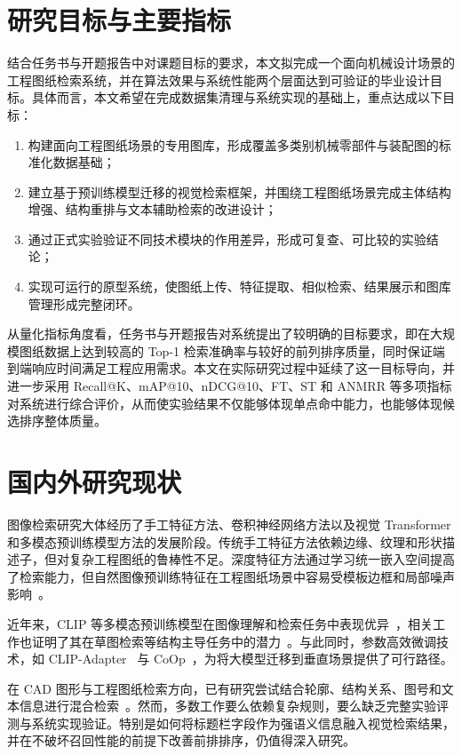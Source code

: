 \section{研究目标与主要指标}

结合任务书与开题报告中对课题目标的要求，本文拟完成一个面向机械设计场景的工程图纸检索系统，并在算法效果与系统性能两个层面达到可验证的毕业设计目标。具体而言，本文希望在完成数据集清理与系统实现的基础上，重点达成以下目标：

\begin{enumerate}
  \item 构建面向工程图纸场景的专用图库，形成覆盖多类别机械零部件与装配图的标准化数据基础；
  \item 建立基于预训练模型迁移的视觉检索框架，并围绕工程图纸场景完成主体结构增强、结构重排与文本辅助检索的改进设计；
  \item 通过正式实验验证不同技术模块的作用差异，形成可复查、可比较的实验结论；
  \item 实现可运行的原型系统，使图纸上传、特征提取、相似检索、结果展示和图库管理形成完整闭环。
\end{enumerate}

从量化指标角度看，任务书与开题报告对系统提出了较明确的目标要求，即在大规模图纸数据上达到较高的 Top-1 检索准确率与较好的前列排序质量，同时保证端到端响应时间满足工程应用需求。本文在实际研究过程中延续了这一目标导向，并进一步采用 Recall@K、mAP@10、nDCG@10、FT、ST 和 ANMRR 等多项指标对系统进行综合评价，从而使实验结果不仅能够体现单点命中能力，也能够体现候选排序整体质量。

\section{国内外研究现状}

图像检索研究大体经历了手工特征方法、卷积神经网络方法以及视觉 Transformer 和多模态预训练模型方法的发展阶段。传统手工特征方法依赖边缘、纹理和形状描述子，但对复杂工程图纸的鲁棒性不足。深度特征方法通过学习统一嵌入空间提高了检索能力，但自然图像预训练特征在工程图纸场景中容易受模板边框和局部噪声影响~\citep{zhang2023cbirsurvey,liu2024matchingreview}。

近年来，CLIP 等多模态预训练模型在图像理解和检索任务中表现优异~\citep{radford2021clip,han2024crossmodalreview}，相关工作也证明了其在草图检索等结构主导任务中的潜力~\citep{sain2023clipforallthings}。与此同时，参数高效微调技术，如 CLIP-Adapter~\citep{gao2024clipadapter} 与 CoOp~\citep{zhou2022coop}，为将大模型迁移到垂直场景提供了可行路径。

在 CAD 图形与工程图纸检索方向，已有研究尝试结合轮廓、结构关系、图号和文本信息进行混合检索~\citep{mahajan2025orthocad,heidari2025geometriccad}。然而，多数工作要么依赖复杂规则，要么缺乏完整实验评测与系统实现验证。特别是如何将标题栏字段作为强语义信息融入视觉检索结果，并在不破坏召回性能的前提下改善前排排序，仍值得深入研究。

